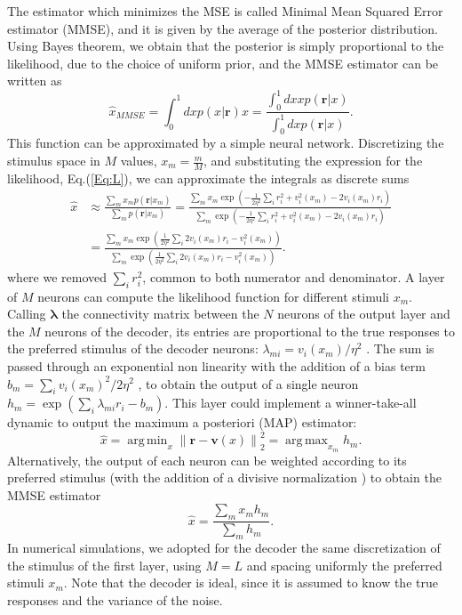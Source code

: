 \documentclass[a4paper]{article}%
\DeclareMathOperator*{\argmin}{arg\,min}
\DeclareMathOperator*{\argmax}{arg\,max}
\begin{document}
The estimator which minimizes the MSE is called Minimal Mean Squared Error
estimator (MMSE), and it is given by the average of the posterior
distribution. Using Bayes theorem, we obtain that the posterior is simply
proportional to the likelihood, due to the choice of uniform prior, and the
MMSE estimator can be written as
\begin{equation}
\hat{x}_{MMSE} = \int_{0}^{1} dx p(x| \mathbf{r}) x = \frac{\displaystyle\int_{0}^{1} dx x
p(\mathbf{r}|x)}{\displaystyle\int_{0}^{1} dx p(\mathbf{r}|x)}.
\end{equation}
This function can be approximated by a simple neural network. Discretizing the
stimulus space in $M$ values, $x_{m} = \frac{m}{M}$, and substituting the
expression for the likelihood, Eq.(\ref{Eq:L}), we can approximate the
integrals as discrete sums
\begin{equation}
\begin{split}
\hat{x}  & \approx \frac{\sum_{m} x_{m} p\left(\mathbf{r}|x_{m}\right)}{\sum_{m} p\left(\mathbf{r} |x_{m}\right)} = \frac{\sum_m x_m \exp{\left(-\frac{1}{2\eta^2}\sum_{i} r_i^2 +
v_i^2 (x_m) - 2v_i(x_m)r_{i} \right)}}{\sum_{m}
\exp{\left(-\frac{1}{2\eta^2}\sum_i r_i^2 + v_i^2(x_m) - 2v_i(x_m)r_i
\right)}}\\
&  = \frac{\sum_{m} x_{m} \exp{\left(\frac{1}{2\eta^2}\sum_{i} 2v_{i}(x_{m})r_{i}
-v_{i}^{2}(x_{m})\right) }}{\sum_{m} \exp{\left( \frac{1}{2\eta^2} \sum_{i}
2v_{i}(x_{m})r_{i}-v_{i}^{2}(x_{m})\right) }}.
\end{split}
\end{equation}
where we removed $\sum_{i} r_{i}^{2} $, common to both numerator and
denominator. A layer of $M$ neurons can compute the likelihood function for
different stimuli $x_{m}$. Calling $\mathbf{\lambda}$ the connectivity matrix
between the $N$ neurons of the output layer and the $M$ neurons of the
decoder, its entries are proportional to the true responses to the preferred
stimulus of the decoder neurons: $\lambda_{mi} = v_{i}(x_{m})/\eta^{2}
$ . The sum is passed through an exponential non linearity with the addition
of a bias term $b_{m} = \sum_{i} v_{i}(x_{m})^{2}/2\eta^{2}$ , to
obtain the output of a single neuron $h_{m} = \exp{\left(\sum_{i} \lambda
_{mi}r_{i} - b_{m}\right)}$. This layer could implement a winner-take-all
dynamic to output the maximum a posteriori (MAP) estimator:
\begin{equation}
\hat{x} = \argmin_{x} \left\| \mathbf{r}-\mathbf{v}(x)\right\| _{2}^{2} =
\argmax_{x_{m}}h_{m}.
\label{Eq:ML}
\end{equation}
Alternatively, the output of each neuron can be weighted according to its
preferred stimulus (with the addition of a divisive normalization ) to obtain
the MMSE estimator
\begin{equation}
\hat{x} = \frac{\sum_{m} x_{m} h_{m}}{\sum_{m} h_{m}}.
\label{Eq:Dec}
\end{equation}
In numerical simulations, we adopted for the decoder the same discretization
of the stimulus of the first layer, using $M=L$ and spacing uniformly the
preferred stimuli $x_{m}$. Note that the decoder is ideal, since it is assumed
to know the true responses and the variance of the noise. 
\end{document}
